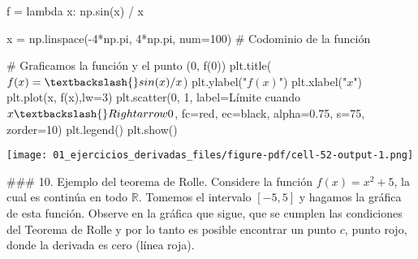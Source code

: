 \documentclass[
  letterpaper,
  DIV=11,
  numbers=noendperiod]{scrreprt}
\newenvironment{Shaded}{\begin{snugshade}}{\end{snugshade}}
\newcommand{\CommentTok}[1]{\textcolor[rgb]{0.37,0.37,0.37}{#1}}
\newcommand{\DecValTok}[1]{\textcolor[rgb]{0.68,0.00,0.00}{#1}}
\newcommand{\FloatTok}[1]{\textcolor[rgb]{0.68,0.00,0.00}{#1}}
\newcommand{\KeywordTok}[1]{\textcolor[rgb]{0.00,0.23,0.31}{#1}}
\newcommand{\NormalTok}[1]{\textcolor[rgb]{0.00,0.23,0.31}{#1}}
\newcommand{\OperatorTok}[1]{\textcolor[rgb]{0.37,0.37,0.37}{#1}}
\newcommand{\StringTok}[1]{\textcolor[rgb]{0.13,0.47,0.30}{#1}}
\begin{document}
\begin{Shaded}
\begin{Highlighting}[]
\NormalTok{f }\OperatorTok{=} \KeywordTok{lambda}\NormalTok{ x: np.sin(x) }\OperatorTok{/}\NormalTok{ x}

\NormalTok{x }\OperatorTok{=}\NormalTok{ np.linspace(}\OperatorTok{{-}}\DecValTok{4}\OperatorTok{*}\NormalTok{np.pi, }\DecValTok{4}\OperatorTok{*}\NormalTok{np.pi, num}\OperatorTok{=}\DecValTok{100}\NormalTok{) }\CommentTok{\# Codominio de la función}

\CommentTok{\# Graficamos la función y el punto (0, f(0))}
\NormalTok{plt.title(}\StringTok{\textquotesingle{}$f(x)=\textbackslash{}sin(x) / x$\textquotesingle{}}\NormalTok{)}
\NormalTok{plt.ylabel(}\StringTok{"$f(x)$"}\NormalTok{)}
\NormalTok{plt.xlabel(}\StringTok{"$x$"}\NormalTok{)}
\NormalTok{plt.plot(x, f(x),lw}\OperatorTok{=}\DecValTok{3}\NormalTok{)}
\NormalTok{plt.scatter(}\DecValTok{0}\NormalTok{, }\DecValTok{1}\NormalTok{, label}\OperatorTok{=}\StringTok{\textquotesingle{}Límite cuando $x \textbackslash{}Rightarrow 0$\textquotesingle{}}\NormalTok{, fc}\OperatorTok{=}\StringTok{\textquotesingle{}red\textquotesingle{}}\NormalTok{, ec}\OperatorTok{=}\StringTok{\textquotesingle{}black\textquotesingle{}}\NormalTok{, alpha}\OperatorTok{=}\FloatTok{0.75}\NormalTok{, s}\OperatorTok{=}\DecValTok{75}\NormalTok{, zorder}\OperatorTok{=}\DecValTok{10}\NormalTok{)}
\NormalTok{plt.legend()}
\NormalTok{plt.show()}
\end{Highlighting}
\end{Shaded}

\texttt{[image: 01\_ejercicios\_derivadas\_files/figure-pdf/cell-52-output-1.png]}

\#\#\# 10. Ejemplo del teorema de Rolle. Considere la función
\(f(x)= x^2 + 5\), la cual es continúa en todo \(\mathbb{R}\). Tomemos
el intervalo \([-5,5]\) y hagamos la gráfica de esta función. Observe en
la gráfica que sigue, que se cumplen las condiciones del Teorema de
Rolle y por lo tanto es posible encontrar un punto \(c\), punto rojo,
donde la derivada es cero (línea roja).
\end{document}
